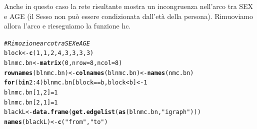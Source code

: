 \documentclass{article}\usepackage[]{graphicx}\usepackage[]{xcolor}
\makeatletter
\newcommand{\hlnum}[1]{\textcolor[rgb]{0.686,0.059,0.569}{#1}}%
\newcommand{\hlstr}[1]{\textcolor[rgb]{0.192,0.494,0.8}{#1}}%
\newcommand{\hlcom}[1]{\textcolor[rgb]{0.678,0.584,0.686}{\textit{#1}}}%
\newcommand{\hlopt}[1]{\textcolor[rgb]{0,0,0}{#1}}%
\newcommand{\hlstd}[1]{\textcolor[rgb]{0.345,0.345,0.345}{#1}}%
\newcommand{\hlkwa}[1]{\textcolor[rgb]{0.161,0.373,0.58}{\textbf{#1}}}%
\newcommand{\hlkwb}[1]{\textcolor[rgb]{0.69,0.353,0.396}{#1}}%
\newcommand{\hlkwc}[1]{\textcolor[rgb]{0.333,0.667,0.333}{#1}}%
\newcommand{\hlkwd}[1]{\textcolor[rgb]{0.737,0.353,0.396}{\textbf{#1}}}%
\newenvironment{kframe}{%
 \def\at@end@of@kframe{}%
 \ifinner\ifhmode%
  \def\at@end@of@kframe{\end{minipage}}%
  \begin{minipage}{\columnwidth}%
 \fi\fi%
 \def\FrameCommand##1{\hskip\@totalleftmargin \hskip-\fboxsep
 \colorbox{shadecolor}{##1}\hskip-\fboxsep
     \hskip-\linewidth \hskip-\@totalleftmargin \hskip\columnwidth}%
 \MakeFramed {\advance\hsize-\width
   \@totalleftmargin\z@ \linewidth\hsize
   \@setminipage}}%
 {\par\unskip\endMakeFramed%
 \at@end@of@kframe}
\newenvironment{knitrout}{}{} %
\makeatother
\begin{document}
      Anche in questo caso la rete risultante mostra un incongruenza nell'arco
      tra SEX e AGE (il Sesso non può essere condizionata dall'età della persona).
      Rimuoviamo allora l'arco e rieseguiamo la funzione hc.
      
\begin{knitrout}
\color{fgcolor}\begin{kframe}
\begin{alltt}
\hlcom{#Rimozione arco tra SEX e AGE}
\hlstd{block}\hlkwb{<-}\hlkwd{c}\hlstd{(}\hlnum{1}\hlstd{,} \hlnum{1}\hlstd{,} \hlnum{2}\hlstd{,} \hlnum{4}\hlstd{,} \hlnum{3}\hlstd{,} \hlnum{3}\hlstd{,} \hlnum{3}\hlstd{,} \hlnum{3}\hlstd{)}
\hlstd{blnmc.bn} \hlkwb{<-} \hlkwd{matrix}\hlstd{(}\hlnum{0}\hlstd{,} \hlkwc{nrow}\hlstd{=}\hlnum{8}\hlstd{,} \hlkwc{ncol}\hlstd{=}\hlnum{8}\hlstd{)}
\hlkwd{rownames}\hlstd{(blnmc.bn)} \hlkwb{<-} \hlkwd{colnames}\hlstd{(blnmc.bn)} \hlkwb{<-} \hlkwd{names}\hlstd{(nmc.bn)}
\hlkwa{for} \hlstd{(b} \hlkwa{in} \hlnum{2}\hlopt{:}\hlnum{4}\hlstd{) blnmc.bn[block}\hlopt{==}\hlstd{b, block}\hlopt{<}\hlstd{b]} \hlkwb{<-} \hlnum{1}
\hlstd{blnmc.bn[}\hlnum{1}\hlstd{,}\hlnum{2}\hlstd{]} \hlkwb{=} \hlnum{1}
\hlstd{blnmc.bn[}\hlnum{2}\hlstd{,}\hlnum{1}\hlstd{]} \hlkwb{=} \hlnum{1}
\hlstd{blackL} \hlkwb{<-} \hlkwd{data.frame}\hlstd{(}\hlkwd{get.edgelist}\hlstd{(}\hlkwd{as}\hlstd{(blnmc.bn,} \hlstr{"igraph"}\hlstd{)))}
\hlkwd{names}\hlstd{(blackL)} \hlkwb{<-} \hlkwd{c}\hlstd{(}\hlstr{"from"}\hlstd{,} \hlstr{"to"}\hlstd{)}
\end{alltt}
\end{kframe}
\end{knitrout}
\end{document}
